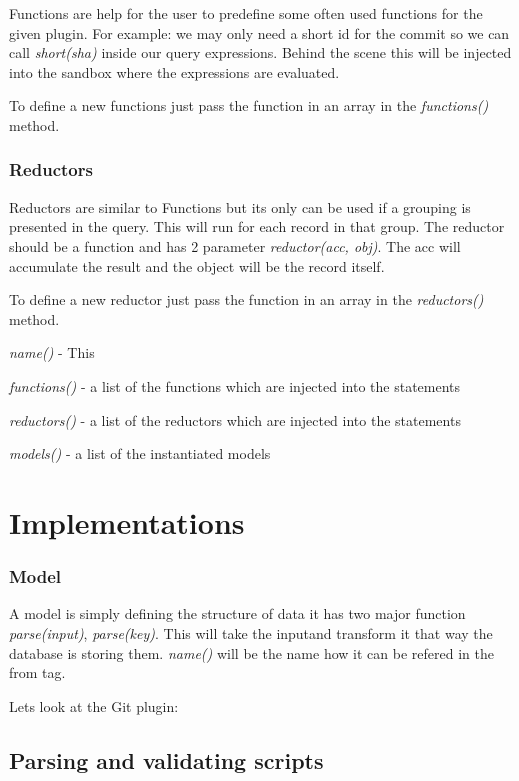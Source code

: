 Functions are help for the user to predefine some often used functions for the given plugin.
For example: we may only need a short id for the commit so we can call \textit{short(sha)} inside our query expressions.
Behind the scene this will be injected into the sandbox where the expressions are evaluated.

To define a new functions just pass the function in an array in the \textit{functions()} method.

\subsubsection{Reductors}

Reductors are similar to Functions but its only can be used if a grouping is presented in the query. This will
run for each record in that group. The reductor should be a function and has 2 parameter \textit{reductor(acc, obj)}.
The acc will accumulate the result and the object will be the record itself.

To define a new reductor just pass the function in an array in the \textit{reductors()} method.

\item \textit{name()} - This 
\item \textit{functions()} - a list of the functions which are injected into the statements
\item \textit{reductors()} - a list of the reductors which are injected into the statements
\item \textit{models()} - a list of the instantiated models
\section{Implementations}

\subsubsection{Model}

A model is simply defining the structure of data it has two major function \textit{parse(input)}, \textit{parse(key)}. 
This will take the inputand transform it that way the database is storing them. 
\textit{name()} will be the name how it can be refered in the from tag.

Lets look at the Git plugin:



\subsection{Parsing and validating scripts}

